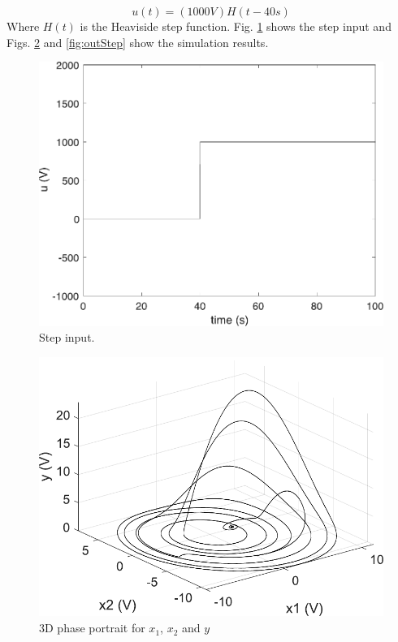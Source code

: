     \begin{equation}
        u(t)=(1000V)H(t-40s)
    \end{equation}
    Where $H(t)$ is the Heaviside step function. Fig. \ref{fig:inputStep} shows the step input and Figs. \ref{fig:3dStep} and \ref{fig:outStep} show the simulation results.
    \begin{figure}[H]
        \centering
        \includegraphics[scale=0.35]{figs/InputStep.pdf}
        \caption{Step input.}
        \label{fig:inputStep}
    \end{figure}
    \begin{figure}[H]
        \includegraphics[scale=0.4]{figs/3dStepInput.pdf}
        \centering
        \caption{3D phase portrait for $x_1$, $x_2$ and $y$}
        \label{fig:3dStep}
    \end{figure}
